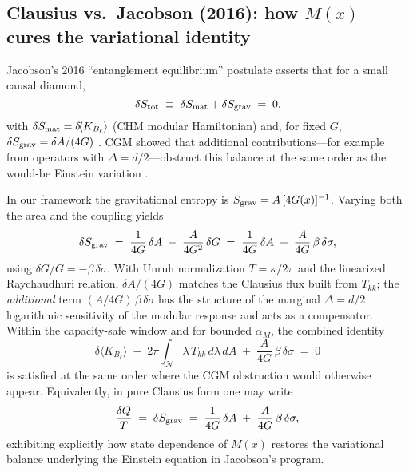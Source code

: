 \documentclass[aps,prd,onecolumn,superscriptaddress,nofootinbib]{revtex4-2}
\begin{document}
\subsection{Clausius vs.\ Jacobson (2016): how \texorpdfstring{$M(x)$}{M(x)} cures the variational identity}
\label{sec:clausius-vs-jacobson}
Jacobson’s 2016 “entanglement equilibrium” postulate asserts that for a small causal diamond,
\begin{equation}
\delta S_{\rm tot} \;\equiv\; \delta S_{\rm mat} + \delta S_{\rm grav} \;=\; 0,
\end{equation}
with \(\delta S_{\rm mat}=\delta\!\langle K_{B_\ell}\rangle\) (CHM modular Hamiltonian) and, for fixed \(G\), \(\delta S_{\rm grav}=\delta A/(4G)\) \cite{Jacobson2016}. CGM showed that additional contributions—for example from operators with \(\Delta=d/2\)—obstruct this balance at the same order as the would-be Einstein variation \cite{CGM2016}.

In our framework the gravitational entropy is \(S_{\rm grav}=A\,[4G(x)]^{-1}\). Varying both the area and the coupling yields
\begin{equation}
\delta S_{\rm grav}
\;=\;\frac{1}{4G}\,\delta A \;-\; \frac{A}{4G^2}\,\delta G
\;=\;\frac{1}{4G}\,\delta A \;+\; \frac{A}{4G}\,\beta\,\delta\sigma,
\label{eq:deltaSgrav-runningG}
\end{equation}
using \(\delta G/G=-\beta\,\delta\sigma\). With Unruh normalization \(T=\kappa/2\pi\) and the linearized Raychaudhuri relation, \(\delta A/(4G)\) matches the Clausius flux built from \(T_{kk}\); the \emph{additional} term \((A/4G)\,\beta\,\delta\sigma\) has the structure of the marginal \(\Delta=d/2\) logarithmic sensitivity of the modular response and acts as a compensator. Within the capacity-safe window and for bounded \(\alpha_M\), the combined identity
\begin{equation}
\delta\!\langle K_{B_\ell}\rangle
\;-\;2\pi\!\int_{\mathcal N}\lambda\,T_{kk}\,d\lambda\,dA
\;+\;\frac{A}{4G}\,\beta\,\delta\sigma \;=\; 0
\end{equation}
is satisfied at the same order where the CGM obstruction would otherwise appear. Equivalently, in pure Clausius form one may write
\begin{equation}
\frac{\delta Q}{T} \;=\; \delta S_{\rm grav}
\;=\; \frac{1}{4G}\,\delta A \;+\; \frac{A}{4G}\,\beta\,\delta\sigma,
\end{equation}
exhibiting explicitly how state dependence of \(M(x)\) restores the variational balance underlying the Einstein equation in Jacobson’s program.
\end{document}
